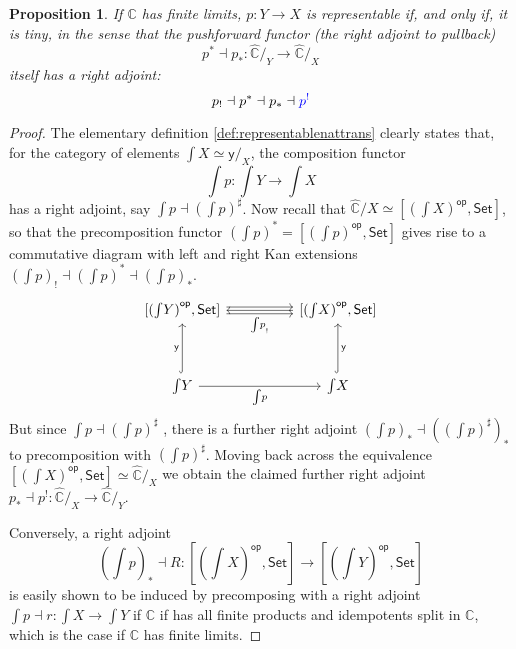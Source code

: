 \documentclass[12pt,reqno]{amsart}
\newcommand{\C}{\ensuremath{\mathbb{C}}}
\newcommand{\op}[1]{\ensuremath{{#1}^{\mathsf{op}}}}
\newcommand{\psh}[1]{\ensuremath{[\op{#1},\mathsf{Set}]}}
\newcommand{\y}{\ensuremath{\mathsf{y}}} %
\renewcommand{\to}{\ensuremath{\rightarrow}}
\newcommand{\too}{\ensuremath{\longrightarrow}}
\newtheorem{proposition}[theorem]{Proposition}
\theoremstyle{remark}
\theoremstyle{definition}
\begin{document}
\begin{proposition}\label{prop:rep_is_tiny}
If $\C$ has finite limits, $p : Y \to X$ is representable if, and only if, it is \emph{tiny}, in the sense that the \emph{pushforward functor} (the right adjoint to pullback) 
\[
p^* \dashv p_* : \widehat{\C}/_{Y} \longrightarrow \widehat{\C}/_{X}
\]
itself has a \emph{right} adjoint:
\[
p_! \dashv p^*\dashv p_* \dashv {\color{blue}p^!}
\]
\end{proposition}

\begin{proof}
The elementary definition \ref{def:representablenattrans} clearly states that, for the category of elements ${\int\!X} \simeq {\y{}/_X}$, the composition functor 
\[\textstyle
{\int\!p} : {\int\!Y} \to {\int\!X}
\]  
has a right adjoint, say ${\int\!p} \dashv ({\int\!p})^\sharp$. Now recall that $\widehat{\C}/{X} \simeq \psh{(\int\!X)}$, so that the precomposition functor $({\int\!p})^* = \psh{({\int\!p})}$ gives rise to a commutative diagram with left and right Kan extensions $({\int\!p})_!\dashv ({\int\!p})^* \dashv ({\int\!p})_*$.
\begin{equation}\begin{tikzcd}
\psh{(\int{\!Y})} \ar[rr,shift right,swap, "{\int\!p}_!"]  \ar[rr,shift left] &&   \psh{(\int{\!X})} \ar[ll] \\
&& \\
\int{\!Y} \ar[uu, hook, "{\y{}}"]  \ar[rr, swap, "{\int\!p}"]  &&  \int{\!X} \ar[uu, swap,hook, "{\y{}}"]
\end{tikzcd}\end{equation}
%
But since ${\int\!p} \dashv ({\int\!p})^\sharp$ , there is a further right adjoint $({\int\!p})_* \dashv (({\int\!p})^\sharp)_*$ to precomposition with $({\int\!p})^\sharp$.  Moving back across the equivalence $\psh{(\int\!X)} \simeq \widehat{\C}/_{X}$ we obtain the claimed further right adjoint $p_*\dashv p^! :  \widehat{\C}/_{X} \too \widehat{\C}/_{Y}$.  

Conversely, a right adjoint $$\textstyle ({\int\!p})_* \dashv R : \psh{(\int{\!X})} \to \psh{(\int{\!Y})}$$ is easily shown to be induced by precomposing with a right adjoint ${\int\!p} \dashv r : {\int\!X} \to {\int\!Y}$ if $\C$ if has all finite products and idempotents split in $\C$, which is the case if $\C$ has finite limits.
\end{proof}
\end{document}
